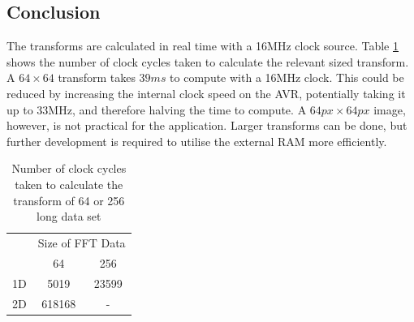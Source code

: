 \subsection{Conclusion}
The transforms are calculated in real time with a 16MHz clock source. Table \ref{table:FFTSize_Time} shows the number of clock cycles taken to calculate the relevant sized transform. A $64 \times 64$ transform takes $39ms$ to compute with a 16MHz clock. This could be reduced by increasing the internal clock speed on the AVR, potentially taking it up to 33MHz, and therefore halving the time to compute. A $64px \times 64px$ image, however, is not practical for the application. Larger transforms can be done, but further development is required to utilise the external RAM more efficiently.%

\begin{table}
\centering
\caption{Number of clock cycles taken to calculate the transform of 64 or 256 long data set}
\label{table:FFTSize_Time}
\begin{tabular}{ccc} \toprule
 	& \multicolumn{2}{c}{ Size of FFT Data } \\ \cmidrule{2-3}
	& 	64 		& 	256 \\ \toprule
1D 	&	5019 	& 	23599		\\ \midrule
2D 	& 	618168 	& 	- 	\\ \bottomrule
\end{tabular}
\end{table}




